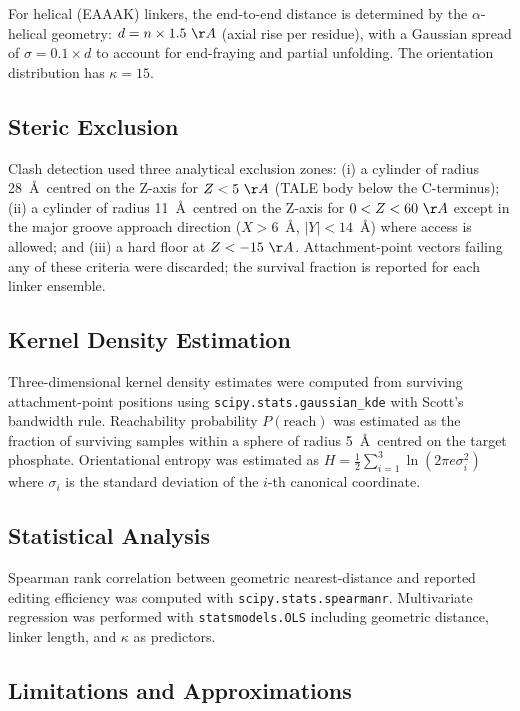 \documentclass[11pt,a4paper]{article}
\newcommand{\angstrom}{\AA}
\newcommand{\preach}{P(\mathrm{reach})}
\begin{document}
For helical (EAAAK) linkers, the end-to-end distance is determined by the $\alpha$-helical
geometry: $d = n \times 1.5~\angstrom$ (axial rise per residue), with a Gaussian
spread of $\sigma = 0.1 \times d$ to account for end-fraying and partial unfolding.
The orientation distribution has $\kappa = 15$.

\subsection{Steric Exclusion}

Clash detection used three analytical exclusion zones: (i) a cylinder of radius 28~\angstrom\
centred on the Z-axis for $Z < 5~\angstrom$ (TALE body below the C-terminus); (ii) a
cylinder of radius 11~\angstrom\ centred on the Z-axis for $0 < Z < 60~\angstrom$ except
in the major groove approach direction ($X > 6$~\angstrom, $|Y| < 14$~\angstrom) where
access is allowed; and (iii) a hard floor at $Z < -15~\angstrom$. Attachment-point vectors
failing any of these criteria were discarded; the survival fraction is reported for
each linker ensemble.

\subsection{Kernel Density Estimation}

Three-dimensional kernel density estimates were computed from surviving attachment-point
positions using \texttt{scipy.stats.gaussian\_kde} with Scott's bandwidth rule.
Reachability probability $\preach$ was estimated as the fraction of surviving samples
within a sphere of radius 5~\angstrom\ centred on the target phosphate. Orientational
entropy was estimated as $H = \frac{1}{2}\sum_{i=1}^{3} \ln(2\pi e \sigma_i^2)$
where $\sigma_i$ is the standard deviation of the $i$-th canonical coordinate.

\subsection{Statistical Analysis}

Spearman rank correlation between geometric nearest-distance and reported editing
efficiency was computed with \texttt{scipy.stats.spearmanr}. Multivariate regression
was performed with \texttt{statsmodels.OLS} including geometric distance, linker length,
and $\kappa$ as predictors.

\subsection{Limitations and Approximations}
\end{document}
